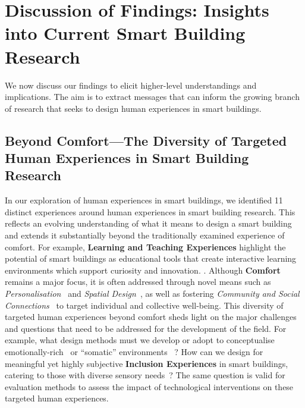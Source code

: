 \section{Discussion of Findings: Insights into Current Smart Building Research}
\label{sec-ch2:implications}
We now discuss our findings to elicit higher-level understandings and implications. The aim is to extract messages that can inform the growing branch of research that seeks to design human experiences in smart buildings.

\subsection{Beyond Comfort---The Diversity of Targeted Human Experiences in Smart Building Research}
\label{sec-ch2:implications-landscape}
In our exploration of human experiences in smart buildings, we identified 11 distinct experiences around human experiences in smart building research. This reflects an evolving understanding of what it means to design a smart building and extends it substantially beyond the traditionally examined experience of comfort. For example, \textbf{Learning and Teaching Experiences} highlight the potential of smart buildings as educational tools that create interactive learning environments which support curiosity and innovation. \cite{lui2014supporting}. Although \textbf{Comfort} remains a major focus, it is often addressed through novel means such as \textit{Personalisation}~\cite{radic2023advanced} and  \textit{Spatial Design}~\cite{nguyen2022towards}, as well as fostering \textit{Community and Social Connections}~\cite{olsen2017wizard} to target individual and collective well-being. 
This diversity of targeted human experiences beyond comfort sheds light on the major challenges and questions that need to be addressed for the development of the field. For example, what design methods must we develop or adopt to conceptualise emotionally-rich~\cite{rao2023towards} or ``somatic'' environments ~\cite{alfonso2024embodied}? How can we design for meaningful yet highly subjective \textbf{Inclusion Experiences} in smart buildings, catering to those with diverse sensory needs~\cite{swaminathan2021tactile, ahlquist2017sensory}? The same question is valid for evaluation methods to assess the impact of technological interventions on these targeted human experiences. 


